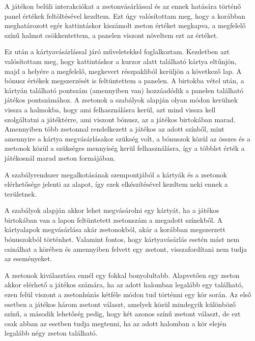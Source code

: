 
A játékon belüli interakciókat a zsetonvásárlással és az ennek hatására történő panel értékek feltöltésével kezdtem. Ezt úgy valósítottam meg, hogy a korábban meghatározott egér kattintáskor kiszámolt zseton értéket megkapva, a megfelelő színű halmot csökkentettem, a panelen viszont növeltem ezt az értéket.

Ez után a kártyavásárlással járó műveletekkel foglalkoztam. Kezdetben azt valósítottam meg, hogy kattintáskor a kurzor alatt található kártya eltűnjön, majd a helyére a megfelelő, megkevert részpakliból kerüljön a következő lap. A bónusz értékek megszerzését is feltüntettem a panelen. A birtokba vétel után, a kártyán található pontszám (amennyiben van) hozzáadódik a panelen található játékos pontszámához. A zsetonok a szabályok alapján olyan módon kerülnek vissza a halmokba, hogy ami felhasználásra kerül, azt mind vissza kell szolgáltatni a játéktérre, ami viszont bónusz, az a játékos birtokában marad. Amennyiben több zsetonnal rendelkezett a játékos az adott színből, mint amennyire a kártya megvásárlásakor szükség volt, a bónuszok közül az összes és a zsetonok közül a szükséges mennyiség kerül felhasználásra, így a többlet érték a játékosnál marad zseton formájában.


A szabályrendszer megalkotásának szempontjából a kártyák és a zsetonok elérhetősége jelenti az alapot, így ezek elkészítésével kezdtem neki ennek a területnek.

A szabályok alapján akkor lehet megvásárolni egy kártyát, ha a játékos birtokában van a lapon feltüntetett zsetonszám a megadott színekből. A kártyalapok megvásárlása akár zsetonokból, akár a korábban megszerzett bónuszokból történhet. Valamint fontos, hogy kártyavásárlás esetén mást nem csinálhat a körében és amennyiben felvett egy zsetont, visszafordítani nem tudja az eseményeket.

A zsetonok kiválasztása ennél egy fokkal bonyolultabb. Alapvetően egy zseton akkor elérhető a játékos számára, ha az adott halomban legalább egy található, ezen felül viszont a zsetonhúzás kétféle módon tud történni egy kör során. Az első esetben a játékos három zsetont választ, amelyek közül mindegyik különböző színű, a második lehetőség pedig, hogy két azonos színű zsetont választ, de ezt csak abban az esetben tudja megtenni, ha az adott halomban a kör elején legalább négy zseton található.


